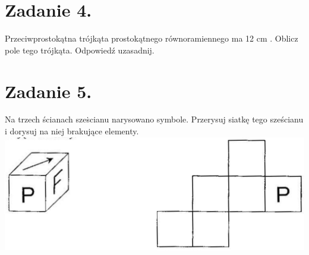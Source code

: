 \documentclass[10pt]{article}
\begin{document}
\section*{Zadanie 4.}
Przeciwprostokątna trójkąta prostokątnego równoramiennego ma 12 cm . Oblicz pole tego trójkąta. Odpowiedź uzasadnij.

\section*{Zadanie 5.}
Na trzech ścianach szeṡcianu narysowano symbole. Przerysuj siatkę tego sześcianu i dorysuj na niej brakujące elementy.\\
\includegraphics[max width=\textwidth, center]{2024_11_21_deb47e5e36e83c8083c2g-1}
\end{document}
